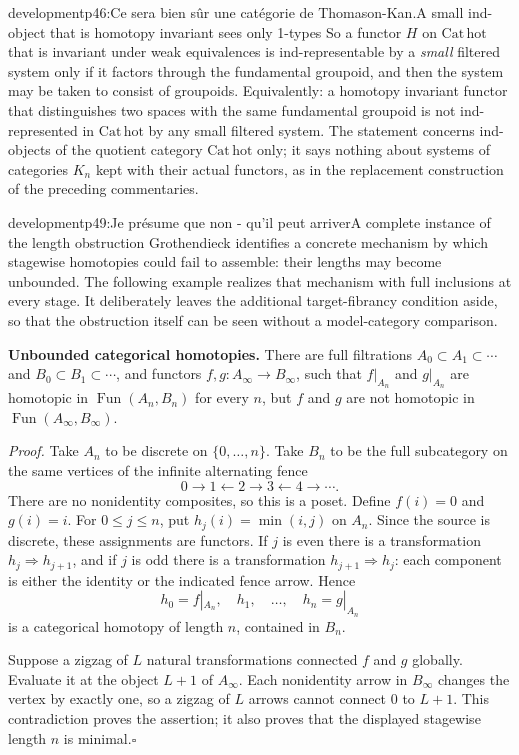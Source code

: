 \begin{dcomment}{development}{p46:Ce sera bien sûr une catégorie de Thomason-Kan.}{A small ind-object that is homotopy invariant sees only 1-types}
So a functor $H$ on $\mathrm{Cat}\,\mathrm{hot}$ that is invariant under weak equivalences is ind-representable by a \emph{small} filtered system only if it factors through the fundamental groupoid, and then the system may be taken to consist of groupoids. Equivalently: a homotopy invariant functor that distinguishes two spaces with the same fundamental groupoid is not ind-represented in $\mathrm{Cat}\,\mathrm{hot}$ by any small filtered system. The statement concerns ind-objects of the quotient category $\mathrm{Cat}\,\mathrm{hot}$ only; it says nothing about systems of categories $K_n$ kept with their actual functors, as in the replacement construction of the preceding commentaries.
\end{dcomment}

\begin{dcomment}{development}{p49:Je présume que non - qu'il peut arriver}{A complete instance of the length obstruction}
Grothendieck identifies a concrete mechanism by which stagewise homotopies could fail to assemble: their lengths may become unbounded. The following example realizes that mechanism with full inclusions at every stage. It deliberately leaves the additional target-fibrancy condition aside, so that the obstruction itself can be seen without a model-category comparison.

\textbf{Unbounded categorical homotopies.}\ours\quad
There are full filtrations $A_0\subset A_1\subset\cdots$ and $B_0\subset B_1\subset\cdots$, and functors $f,g:A_\infty\to B_\infty$, such that $f|_{A_n}$ and $g|_{A_n}$ are homotopic in $\operatorname{Fun}(A_n,B_n)$ for every $n$, but $f$ and $g$ are not homotopic in $\operatorname{Fun}(A_\infty,B_\infty)$.

\textit{Proof.} Take $A_n$ to be discrete on $\{0,\ldots,n\}$. Take $B_n$ to be the full subcategory on the same vertices of the infinite alternating fence
\[
 0\longrightarrow1\longleftarrow2\longrightarrow3
       \longleftarrow4\longrightarrow\cdots.
\]
There are no nonidentity composites, so this is a poset. Define $f(i)=0$ and $g(i)=i$. For $0\leq j\leq n$, put $h_j(i)=\min(i,j)$ on $A_n$. Since the source is discrete, these assignments are functors. If $j$ is even there is a transformation $h_j\Rightarrow h_{j+1}$, and if $j$ is odd there is a transformation $h_{j+1}\Rightarrow h_j$: each component is either the identity or the indicated fence arrow. Hence
\[
 h_0=f|_{A_n},\quad h_1,\quad\ldots,\quad h_n=g|_{A_n}
\]
is a categorical homotopy of length $n$, contained in $B_n$.

Suppose a zigzag of $L$ natural transformations connected $f$ and $g$ globally. Evaluate it at the object $L+1$ of $A_\infty$. Each nonidentity arrow in $B_\infty$ changes the vertex by exactly one, so a zigzag of $L$ arrows cannot connect $0$ to $L+1$. This contradiction proves the assertion; it also proves that the displayed stagewise length $n$ is minimal.\hfill$\square$


\end{dcomment}
